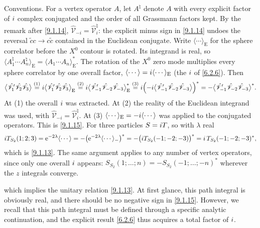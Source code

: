 \begin{tcolorbox}[breakable]
	\begin{remark}
		Conventions. For a vertex operator $A$, let $A^{\natural}$ denote $A$ with every explicit factor of $i$ complex conjugated and the order of all Grassmann factors kept. By the remark after \eqref{9.1.14}, $\hat{\mathscr V}_{-i}=\hat{\mathscr V}_i^{\natural}$: the explicit minus sign in \eqref{9.1.14} undoes the reversal $\tilde c c\to c\tilde c$ contained in the Euclidean conjugate. Write $\langle\cdots\rangle_{\mathrm E}$ for the sphere correlator before the $X^0$ contour is rotated. Its integrand is real, so $\langle A_1^\natural\cdots A_n^\natural\rangle_{\mathrm E}=\langle A_1\cdots A_n\rangle_{\mathrm E}^{*}$. The rotation of the $X^0$ zero mode multiplies every sphere correlator by one overall factor, $\langle\cdots\rangle=i\langle\cdots\rangle_{\mathrm E}$ (the $i$ of \eqref{6.2.6}). Then
		\begin{align*}
			\bigl\langle \hat{\mathscr V}'_1\hat{\mathscr V}_2\hat{\mathscr V}_3\bigr\rangle
			\overset{(1)}{=} i\bigl\langle \hat{\mathscr V}'_1\hat{\mathscr V}_2\hat{\mathscr V}_3\bigr\rangle_{\mathrm E}
			\overset{(2)}{=} i\bigl\langle \hat{\mathscr V}'_{-1}\hat{\mathscr V}_{-2}\hat{\mathscr V}_{-3}\bigr\rangle_{\mathrm E}^{*}
			\overset{(3)}{=} i\Bigl(-i\bigl\langle \hat{\mathscr V}'_{-1}\hat{\mathscr V}_{-2}\hat{\mathscr V}_{-3}\bigr\rangle\Bigr)^{*}
			= -\bigl\langle \hat{\mathscr V}'_{-1}\hat{\mathscr V}_{-2}\hat{\mathscr V}_{-3}\bigr\rangle^{*} .
		\end{align*}
		At (1) the overall $i$ was extracted. At (2) the reality of the Euclidean integrand was used, with $\hat{\mathscr V}_{-i}=\hat{\mathscr V}_i^\natural$. At (3) $\langle\cdots\rangle_{\mathrm E}=-i\langle\cdots\rangle$ was applied to the conjugated operators. This is \eqref{9.1.15}. For three particles $S=i T$, so with $\lambda$ real
		\begin{equation*}
			i T_{S_2}(1;2;3)=\mathrm{e}^{-2\lambda}\langle\cdots\rangle
			=-\bigl(\mathrm{e}^{-2\lambda}\langle\cdots\rangle_{-}\bigr)^{*}
			=-\bigl(i T_{S_2}(-1;-2;-3)\bigr)^{*}
			=i\,T_{S_2}(-1;-2;-3)^{*} ,
		\end{equation*}
		which is \eqref{9.1.13}. The same argument applies to any number of vertex operators, since only one overall $i$ appears: $S_{S_2}(1;\ldots;n)=-S_{S_2}(-1;\ldots;-n)^{*}$ wherever the $z$ integrals converge.
	\end{remark}
\end{tcolorbox}
which implies the unitary relation \eqref{9.1.13}. At first glance, this path integral is obviously real, and there should be no negative sign in \eqref{9.1.15}. 
However, we recall that this path integral must be defined through a specific analytic continuation, and the explicit result \eqref{6.2.6} thus acquires a total factor of $i$.
